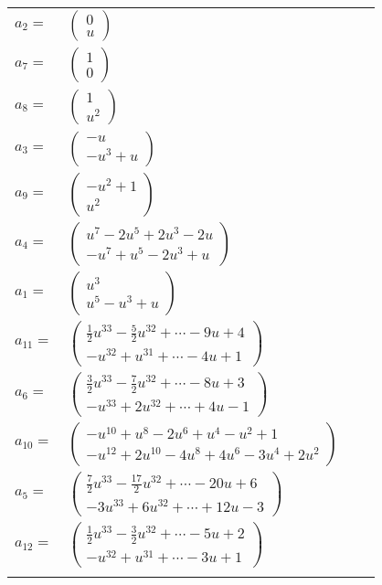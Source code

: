 \documentclass[1p]{elsarticle_modified}
\theoremstyle{definition}
\begin{document}
\begin{tabular}{m{7pt} m{180pt} m{7pt} m{180pt} }
\flushright $a_{2}=$&$\begin{pmatrix}0\\u\end{pmatrix}$ \\
\flushright $a_{7}=$&$\begin{pmatrix}1\\0\end{pmatrix}$ \\
\flushright $a_{8}=$&$\begin{pmatrix}1\\u^2\end{pmatrix}$ \\
\flushright $a_{3}=$&$\begin{pmatrix}- u\\- u^3+u\end{pmatrix}$ \\
\flushright $a_{9}=$&$\begin{pmatrix}- u^2+1\\u^2\end{pmatrix}$ \\
\flushright $a_{4}=$&$\begin{pmatrix}u^7-2 u^5+2 u^3-2 u\\- u^7+u^5-2 u^3+u\end{pmatrix}$ \\
\flushright $a_{1}=$&$\begin{pmatrix}u^3\\u^5- u^3+u\end{pmatrix}$ \\
\flushright $a_{11}=$&$\begin{pmatrix}\frac{1}{2} u^{33}-\frac{5}{2} u^{32}+\cdots-9 u+4\\- u^{32}+u^{31}+\cdots-4 u+1\end{pmatrix}$ \\
\flushright $a_{6}=$&$\begin{pmatrix}\frac{3}{2} u^{33}-\frac{7}{2} u^{32}+\cdots-8 u+3\\- u^{33}+2 u^{32}+\cdots+4 u-1\end{pmatrix}$ \\
\flushright $a_{10}=$&$\begin{pmatrix}- u^{10}+u^8-2 u^6+u^4- u^2+1\\- u^{12}+2 u^{10}-4 u^8+4 u^6-3 u^4+2 u^2\end{pmatrix}$ \\
\flushright $a_{5}=$&$\begin{pmatrix}\frac{7}{2} u^{33}-\frac{17}{2} u^{32}+\cdots-20 u+6\\-3 u^{33}+6 u^{32}+\cdots+12 u-3\end{pmatrix}$ \\
\flushright $a_{12}=$&$\begin{pmatrix}\frac{1}{2} u^{33}-\frac{3}{2} u^{32}+\cdots-5 u+2\\- u^{32}+u^{31}+\cdots-3 u+1\end{pmatrix}$\\&\end{tabular}
\end{document}
